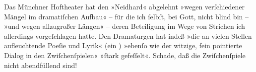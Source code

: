 \pstart
           Das Münchner Hoftheater hat den »Neidhard« abgelehnt »wegen verſchiedener Mängel
               im dramatiſchen Aufbau« –  für die ich{ }ſelbſt, bei Gott, nicht blind bin – »und wegen allzugroßer Längen« – deren
               Beteiligung im Wege von Strichen ich allerdings vorgeſchlagen hatte. Den {\pb}Dramaturgen hat indeß »die an
               vielen Stellen aufleuchtende Poeſie und Lyrik« (ein \label{K_L02260-1v}\label{K_L02260-1}) »ebenſo wie der witzige, fein pointierte Dialog in den
               Zwiſchenſpielen« »ſtark gefeſſelt«. Schade, daß die Zwiſchenſpiele nicht abendfüllend
               sind!\pend
           

